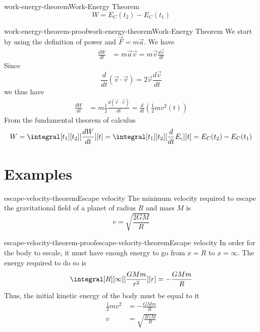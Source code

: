\documentclass[preview]{standalone}
\begin{document}
\begin{snippettheorem}{work-energy-theorem}{Work-Energy Theorem }
    \[
        W = E_C(t_2) - E_C(t_1)
    \]
\end{snippettheorem}

\begin{snippetproof}{work-energy-theorem-proof}{work-energy-theorem}{Work-Energy Theorem}
    We start by using the definition of power and \(\vec{F}=m\vec{a}\). We have
    \begin{align*}
        \frac{dW}{dt} &= m\vec{a}\vec{v} = m\vec{v}\frac{d\vec{v}}{dt}
    \end{align*}
    Since
    \[
        \frac{d}{dt}\left(\vec{v}\cdot \vec{v}\right) = 2\vec{v}\frac{d\vec{v}}{dt}
    \]
    we thus have
    \begin{align*}
        \frac{dW}{dt} &= m \frac{1}{2} \frac{d(\vec{v} \cdot \vec{v})}{dt}
        = \frac{d}{dt} \left(\frac{1}{2} m v^2(t)\right)
    \end{align*}
    From the fundamental theorem of calculus
    \[
        W = \integral[t_1][t_2][\frac{dW}{dt}][t]
        = \integral[t_1][t_2][\frac{d}{dt}E_c][t]
        = E_C(t_2) - E_C(t_1)
    \]
\end{snippetproof}

\section{Examples}

\begin{snippettheorem}{escape-velocity-theorem}{Escape velocity}
    The minimum velocity required to escape the gravitational field
    of a planet of radius \(R\) and mass \(M\) is
    \[
        v = \sqrt{\frac{2GM}{R}}
    \]
\end{snippettheorem}

\begin{snippetproof}{escape-velocity-theorem-proof}{escape-velocity-theorem}{Escape velocity}
    In order for the body to escale, it must have enough energy to go from \(x = R\) to \(x = \infty\).
    The energy required to do so is
    \begin{align*}
        \integral[R][\infty][\frac{GMm}{r^2}][r]
        = - \frac{GMm}{R}
    \end{align*}
    Thus, the initial kinetic energy of the body must be equal to it
    \begin{align*}
        \frac{1}{2}mv^2 &= - \frac{GMm}{R} \\
        v &= \sqrt{\frac{2GM}{R}}
    \end{align*}
\end{snippetproof}
\end{document}
